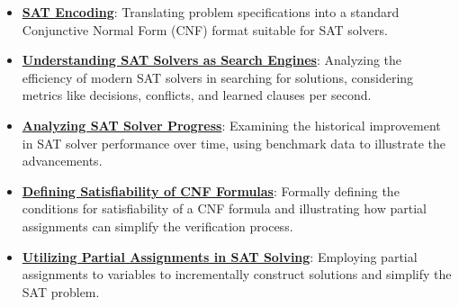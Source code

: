 \documentclass{article}%
\begin{document}
\begin{itemize}[leftmargin=*]
\item \href{https://purdue.brightspace.com/d2l/common/assets/pdfjs-d2l-dist/1.0.14-legacy/web/viewer.html?file=%2Fcontent%2Fenforced%2F1095467-wl.202510.CS.24300.001%2F15L2-SAT.pdf%3Fou%3D1095467&lang=en-us&container=d2l-fileviewer-rendered-pdf&fullscreen=d2l-fileviewer-rendered-pdf-dialog&height=667#page=7}{\textbf{SAT Encoding}}: Translating problem specifications into a standard Conjunctive Normal Form (CNF) format suitable for SAT solvers.%
\item \href{https://purdue.brightspace.com/d2l/common/assets/pdfjs-d2l-dist/1.0.14-legacy/web/viewer.html?file=%2Fcontent%2Fenforced%2F1095467-wl.202510.CS.24300.001%2F15L2-SAT.pdf%3Fou%3D1095467&lang=en-us&container=d2l-fileviewer-rendered-pdf&fullscreen=d2l-fileviewer-rendered-pdf-dialog&height=667#page=11}{\textbf{Understanding SAT Solvers as Search Engines}}: Analyzing the efficiency of modern SAT solvers in searching for solutions, considering metrics like decisions, conflicts, and learned clauses per second.%
\item \href{https://purdue.brightspace.com/d2l/common/assets/pdfjs-d2l-dist/1.0.14-legacy/web/viewer.html?file=%2Fcontent%2Fenforced%2F1095467-wl.202510.CS.24300.001%2F15L2-SAT.pdf%3Fou%3D1095467&lang=en-us&container=d2l-fileviewer-rendered-pdf&fullscreen=d2l-fileviewer-rendered-pdf-dialog&height=667#page=12}{\textbf{Analyzing SAT Solver Progress}}: Examining the historical improvement in SAT solver performance over time, using benchmark data to illustrate the advancements.%
\item \href{https://purdue.brightspace.com/d2l/common/assets/pdfjs-d2l-dist/1.0.14-legacy/web/viewer.html?file=%2Fcontent%2Fenforced%2F1095467-wl.202510.CS.24300.001%2F15L2-SAT.pdf%3Fou%3D1095467&lang=en-us&container=d2l-fileviewer-rendered-pdf&fullscreen=d2l-fileviewer-rendered-pdf-dialog&height=667#page=13}{\textbf{Defining Satisfiability of CNF Formulas}}: Formally defining the conditions for satisfiability of a CNF formula and illustrating how partial assignments can simplify the verification process.%
\item \href{https://purdue.brightspace.com/d2l/common/assets/pdfjs-d2l-dist/1.0.14-legacy/web/viewer.html?file=%2Fcontent%2Fenforced%2F1095467-wl.202510.CS.24300.001%2F15L2-SAT.pdf%3Fou%3D1095467&lang=en-us&container=d2l-fileviewer-rendered-pdf&fullscreen=d2l-fileviewer-rendered-pdf-dialog&height=667#page=14}{\textbf{Utilizing Partial Assignments in SAT Solving}}: Employing partial assignments to variables to incrementally construct solutions and simplify the SAT problem.%

\end{itemize}
\end{document}
